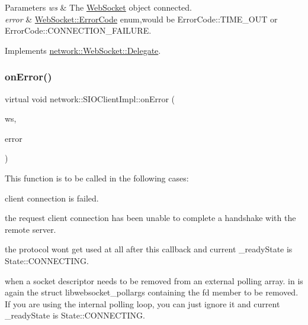\begin{DoxyParams}{Parameters}
{\em ws} & The \hyperlink{classnetwork_1_1WebSocket}{Web\+Socket} object connected. \\
\hline
{\em error} & \hyperlink{classnetwork_1_1WebSocket_a33c111a23355ac485e3a56c9d0ab9a59}{Web\+Socket\+::\+Error\+Code} enum,would be Error\+Code\+::\+T\+I\+M\+E\+\_\+\+O\+UT or Error\+Code\+::\+C\+O\+N\+N\+E\+C\+T\+I\+O\+N\+\_\+\+F\+A\+I\+L\+U\+RE. \\
\hline
\end{DoxyParams}


Implements \hyperlink{classnetwork_1_1WebSocket_1_1Delegate_a0ed2d5dde9abc2901f387b7274221dc4}{network\+::\+Web\+Socket\+::\+Delegate}.

\mbox{\label{classnetwork_1_1SIOClientImpl_a850038d23057d9882f5d689bc7051008}} 
\subsubsection{\texorpdfstring{on\+Error()}{onError()}\hspace{0.1cm}{\footnotesize\ttfamily [2/2]}}
{\footnotesize\ttfamily virtual void network\+::\+S\+I\+O\+Client\+Impl\+::on\+Error (\begin{DoxyParamCaption}\item[{\hyperlink{classnetwork_1_1WebSocket}{Web\+Socket} $\ast$}]{ws,  }\item[{const \hyperlink{classnetwork_1_1WebSocket_a33c111a23355ac485e3a56c9d0ab9a59}{Web\+Socket\+::\+Error\+Code} \&}]{error }\end{DoxyParamCaption})\hspace{0.3cm}{\ttfamily [virtual]}}

This function is to be called in the following cases\+:
\begin{DoxyEnumerate}
\item client connection is failed.
\item the request client connection has been unable to complete a handshake with the remote server.
\item the protocol won\textquotesingle{}t get used at all after this callback and current \+\_\+ready\+State is State\+::\+C\+O\+N\+N\+E\+C\+T\+I\+NG.
\item when a socket descriptor needs to be removed from an external polling array. in is again the struct libwebsocket\+\_\+pollargs containing the fd member to be removed. If you are using the internal polling loop, you can just ignore it and current \+\_\+ready\+State is State\+::\+C\+O\+N\+N\+E\+C\+T\+I\+NG.
\end{DoxyEnumerate}


